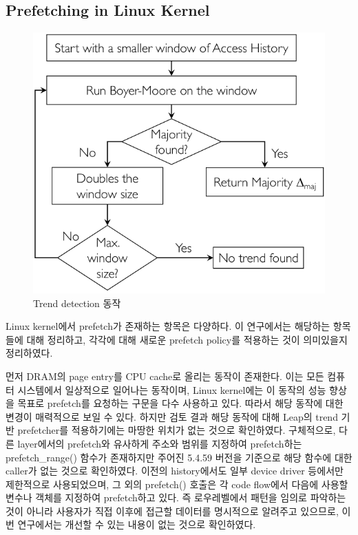 \documentclass[conference,11pt]{IEEEtran}
\begin{document}
\begin{CJK}{UTF8}{}
    \subsection{Prefetching in Linux Kernel}

    \begin{figure}[t]
        \centerline{\includegraphics[width=\linewidth]{leap2.png}}
        \caption{Trend detection 동작}
        \label{fig:leap2}
    \end{figure}

    Linux kernel에서 prefetch가 존재하는 항목은 다양하다. 이 연구에서는 해당하는 항목들에 대해 정리하고, 각각에 대해 새로운 prefetch policy를 적용하는 것이 의미있을지 정리하였다.

    먼저 DRAM의 page entry를 CPU cache로 올리는 동작이 존재한다. 이는 모든 컴퓨터 시스템에서 일상적으로 일어나는 동작이며, Linux kernel에는 이 동작의 성능 향상을 목표로 prefetch를 요청하는 구문을 다수 사용하고 있다. 따라서 해당 동작에 대한 변경이 매력적으로 보일 수 있다. 하지만 검토 결과 해당 동작에 대해 Leap의 trend 기반 prefetcher를 적용하기에는 마땅한 위치가 없는 것으로 확인하였다. 구체적으로, 다른 layer에서의 prefetch와 유사하게 주소와 범위를 지정하여 prefetch하는 prefetch\_range() 함수가 존재하지만 주어진 5.4.59 버전을 기준으로 해당 함수에 대한 caller가 없는 것으로 확인하였다. 이전의 history에서도 일부 device driver 등에서만 제한적으로 사용되었으며, 그 외의 prefetch() 호출은 각 code flow에서 다음에 사용할 변수나 객체를 지정하여 prefetch하고 있다. 즉 로우레벨에서 패턴을 임의로 파악하는 것이 아니라 사용자가 직접 이후에 접근할 데이터를 명시적으로 알려주고 있으므로, 이번 연구에서는 개선할 수 있는 내용이 없는 것으로 확인하였다.


\end{CJK}
\end{document}

